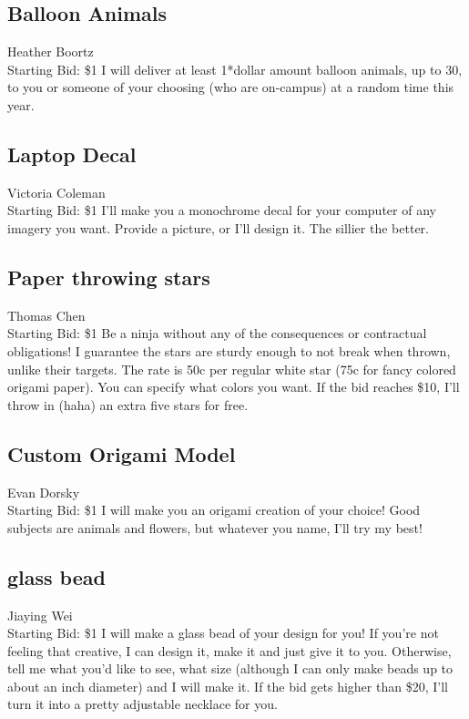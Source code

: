 \documentclass[11pt]{article}
\begin{document}
\subsection{Balloon Animals}
Heather Boortz
\\
Starting Bid: \$1
\newline
I will deliver at least 1*dollar amount balloon animals, up to 30, to you or someone of your choosing (who are on-campus) at a random time this year.
\subsection{Laptop Decal}
Victoria Coleman
\\
Starting Bid: \$1
\newline
I'll make you a monochrome decal for your computer of any imagery you want. Provide a picture, or I'll design it. The sillier the better.
\subsection{Paper throwing stars}
Thomas Chen
\\
Starting Bid: \$1
\newline
Be a ninja without any of the consequences or contractual obligations! I guarantee the stars are sturdy enough to not break when thrown, unlike their targets. The rate is 50c per regular white star (75c for fancy colored origami paper). You can specify what colors you want. If the bid reaches \$10, I'll throw in (haha) an extra five stars for free.
\subsection{Custom Origami Model}
Evan Dorsky
\\
Starting Bid: \$1
\newline
I will make you an origami creation of your choice! Good subjects are animals and flowers, but whatever you name, I'll try my best!
\subsection{glass bead}
Jiaying Wei
\\
Starting Bid: \$1
\newline
I will make a glass bead of your design for you! If you're not feeling that creative, I can design it, make it and just give it to you. Otherwise, tell me what you'd like to see, what size (although I can only make beads up to about an inch diameter) and I will make it. If the bid gets higher than \$20, I'll turn it into a pretty adjustable necklace for you.
\end{document}
